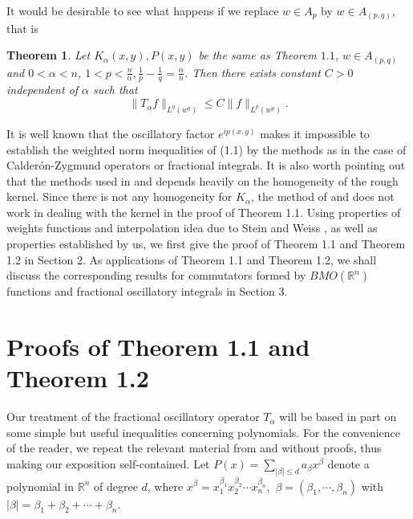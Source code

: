 \documentclass[reqno,12pt]{amsart}
\numberwithin{equation}{section}
\theoremstyle{plain}
\newtheorem{theorem}{\indent\sc Theorem}[section]
\theoremstyle{definition}
\begin{document}
It would be desirable to see what happens if we replace $w\in A_{p}$ by $w\in A_{(p,q)}$, that is
\begin{theorem} Let $K_{\alpha}(x,y),P(x,y)$ be the same as Theorem $1.1$, $w\in A_{(p,q)}$ and $0<\alpha<n$, $1< p<\frac{n}{\alpha}, \frac{1}{p}-\frac{1}{q}=\frac{\alpha}{n}$. Then
there exists constant $C>0$ independent of $\alpha$
such that
$$\|T_{\alpha}f\|_{L^{q}(w^{q})}\leq C\|f\|_{L^{p}(w^{p})}.$$
\end{theorem}
It is well known that the oscillatory factor $e^{ip(x,y)}$ makes it impossible to establish the weighted norm inequalities of (1.1) by the methods as in the case of  Calder\'{o}n-Zygmund  operators or fractional integrals. It is also worth pointing out that the methods used in \cite{D1} and \cite{D2} depends heavily on the homogeneity of the rough kernel. Since there is not any homogeneity for $K_{\alpha}$, the method of \cite{D1} and \cite{D2} does not work in dealing with the kernel in the proof of Theorem 1.1. Using properties of weights functions and interpolation idea due to Stein and Weiss \cite{SW}, as well as properties established by us, we first give the proof of Theorem 1.1 and Theorem 1.2 in Section 2. As applications of Theorem 1.1 and Theorem 1.2, we shall discuss the corresponding results for commutators formed by $BMO(\mathbb{R}^{n})$ functions and fractional oscillatory integrals in Section 3.

\section{Proofs of Theorem 1.1 and Theorem 1.2}
Our treatment of the fractional oscillatory operator $T_{\alpha}$ will be based in part on some simple but useful inequalities concerning polynomials. For the convenience of the reader, we repeat the relevant material from \cite{RS} and \cite{St} without proofs, thus making our exposition self-contained.
Let $P(x)=\sum_{|\beta|\leq d}a_{\beta}x^{\beta}$ denote a polynomial in $\mathbb{R}^{n}$ of degree $d$, where $x^{\beta}=x_{1}^{\beta_{1}}x_{2}^{\beta_{2}}\cdots x_{n}^{\beta_{n}},$ $\beta=(\beta_{1},\cdots, \beta_{n})$ with $|\beta|=\beta_{1}+ \beta_{2}+\cdots+\beta_{n}$.
\end{document}
